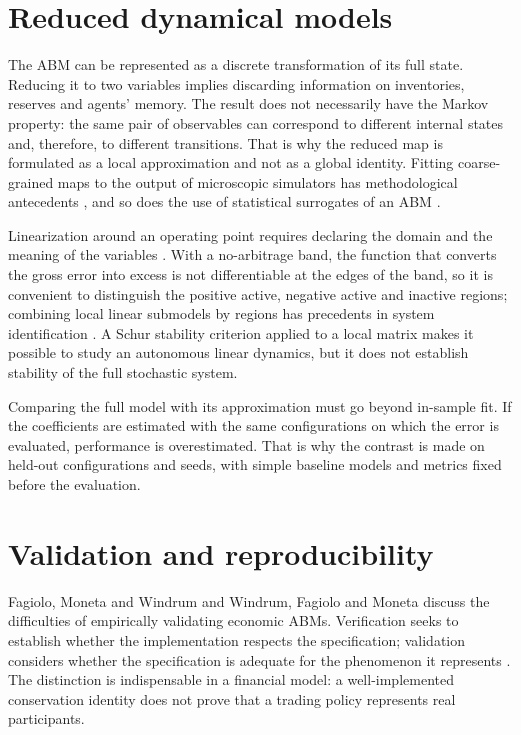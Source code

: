 \section{Reduced dynamical models}

The ABM can be represented as a discrete transformation of its full state. Reducing it to two variables implies discarding information on inventories, reserves and agents' memory. The result does not necessarily have the Markov property: the same pair of observables can correspond to different internal states and, therefore, to different transitions. That is why the reduced map is formulated as a local approximation and not as a global identity. Fitting coarse-grained maps to the output of microscopic simulators has methodological antecedents \cite{gear2003equationfree}, and so does the use of statistical surrogates of an ABM \cite{lamperti2018surrogates}.

Linearization around an operating point requires declaring the domain and the meaning of the variables \cite{roubal2010linearization}. With a no-arbitrage band, the function that converts the gross error into excess is not differentiable at the edges of the band, so it is convenient to distinguish the positive active, negative active and inactive regions; combining local linear submodels by regions has precedents in system identification \cite{takagi1985fuzzy}. A Schur stability criterion \cite{schur1917potenzreihen,jury1962simplified,elaydi2005difference} applied to a local matrix makes it possible to study an autonomous linear dynamics, but it does not establish stability of the full stochastic system.

Comparing the full model with its approximation must go beyond in-sample fit. If the coefficients are estimated with the same configurations on which the error is evaluated, performance is overestimated. That is why the contrast is made on held-out configurations and seeds, with simple baseline models and metrics fixed before the evaluation.

\section{Validation and reproducibility}

Fagiolo, Moneta and Windrum \cite{fagiolo2007critical} and Windrum, Fagiolo and Moneta \cite{windrum2007empirical} discuss the difficulties of empirically validating economic ABMs. Verification seeks to establish whether the implementation respects the specification; validation considers whether the specification is adequate for the phenomenon it represents \cite{sargent2013verification}. The distinction is indispensable in a financial model: a well-implemented conservation identity does not prove that a trading policy represents real participants.


